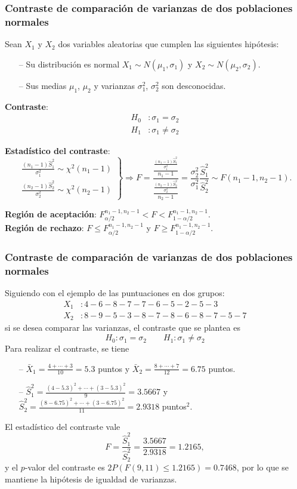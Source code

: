 \begin{frame}
\frametitle{Contraste de comparación de varianzas de dos poblaciones normales}
Sean $X_1$ y $X_2$ dos variables aleatorias que cumplen las siguientes hipótesis:
\begin{itemize}
\item[--] Su distribución es normal $X_1\sim N(\mu_1,\sigma_1)$ y $X_2\sim N(\mu_2,\sigma_2)$.
\item[--] Sus medias $\mu_1$, $\mu_2$ y varianzas $\sigma_1^2$, $\sigma_2^2$ son desconocidas.
\end{itemize}
\textbf{Contraste}:
\begin{align*} 
H_0 &: \sigma_1=\sigma_2\\
H_1 &: \sigma_1\neq \sigma_2
\end{align*}

\textbf{Estadístico del contraste}:
\[
\left.
\begin{array}{l}
\displaystyle \frac{(n_1-1)\hat{S}_1^2}{\sigma_1^2}\sim \chi^2(n_1-1) \\
\displaystyle \frac{(n_2-1)\hat{S}_2^2}{\sigma_2^2}\sim \chi^2(n_2-1)
\end{array}
\right\}
\Rightarrow
F= \frac{\frac{\frac{(n_1-1)\hat{S}_1^2}{\sigma_1^2}}{n_1-1}}{\frac{\frac{(n_2-1)\hat{S}_2^2}{\sigma_2^2}}{n_2-1}} =
\frac{\sigma_2^2}{\sigma_1^2}\frac{\hat{S}_1^2}{\hat{S}_2^2}\sim F(n_1-1,n_2-1).
\]

\textbf{Región de aceptación}: $F^{n_1-1,n_2-1}_{\alpha/2}< F < F^{n_1-1,n_2-1}_{1-\alpha/2}$.\\
\textbf{Región de rechazo}: $F\leq F^{n_1-1,n_2-1}_{\alpha/2}$ y $F\geq F^{n_1-1,n_2-1}_{1-\alpha/2}$.
\end{frame}


\begin{frame}
\frametitle{Contraste de comparación de varianzas de dos poblaciones normales}
Siguiendo con el ejemplo de las puntuaciones en dos grupos:
\begin{align*}
X_1 &: 4 - 6 - 8 - 7 - 7 - 6 - 5 - 2 - 5 - 3 \\
X_2 &: 8 - 9 - 5 - 3 - 8 - 7 - 8 - 6 - 8 - 7 - 5 - 7  
\end{align*}
si se desea comparar las varianzas, el contraste que se plantea es
\[
H_0: \sigma_1=\sigma_2\qquad H_1: \sigma_1\neq \sigma_2
\]
Para realizar el contraste, se tiene
\begin{itemize}
\item[--] $\bar{X}_1 = \frac{4+\cdots +3}{10}=5.3$ puntos y $\bar{X}_2=\frac{8+\cdots +7}{12}=6.75$ puntos.
\item[--] $\hat{S}_1^2= \frac{(4-5.3)^2+\cdots + (3-5.3)^2}{9}=3.5667$ y $\hat{S}_2^2=
\frac{(8-6.75)^2+\cdots + (3-6.75)^2}{11}=2.9318$ puntos$^2$.
\end{itemize}
El estadístico del contraste vale
\[
F = \frac{\hat{S}_1^2}{\hat{S}_2^2} = \frac{3.5667}{2.9318}=1.2165,
\]
y el $p$-valor del contraste es $2P(F(9,11)\leq 1.2165)=0.7468$, por lo que se mantiene la hipótesis de
igualdad de varianzas.
\end{frame}


